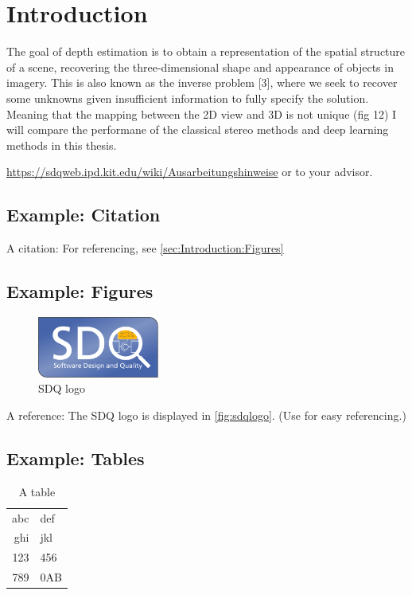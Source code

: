 
\section{Introduction}
\label{ch:Introduction}

The goal of depth estimation is to obtain a representation of the spatial structure of a scene, recovering the three-dimensional shape and appearance of objects in imagery. This is also known as the inverse problem [3], where we seek to recover some unknowns given insufficient information to fully specify the solution. Meaning that the mapping between the 2D view and 3D is not unique (fig 12) I will compare the performane of the classical stereo methods and deep learning methods in this thesis.

\url{https://sdqweb.ipd.kit.edu/wiki/Ausarbeitungshinweise} or to your advisor.

\subsection{Example: Citation}
\label{sec:Introduction:Citation}
A citation: \cite{becker2008a} For referencing, see \autoref{sec:Introduction:Figures}

\subsection{Example: Figures}
\label{sec:Introduction:Figures}
\begin{figure}
\centering
\includegraphics[width=4cm]{images/sdqlogo}
\caption{SDQ logo}
\label{fig:sdqlogo}
\end{figure}

A reference: The SDQ logo is displayed in \autoref{fig:sdqlogo}. 
(Use  for easy referencing.) 

\subsection{Example: Tables}
\label{sec:Introduction:Tables}
\begin{table}
\centering
\begin{tabular}{r l}
\toprule
abc & def\\
ghi & jkl\\
\midrule
123 & 456\\
789 & 0AB\\
\bottomrule
\end{tabular}
\caption{A table}
\label{tab:atable}
\end{table}

